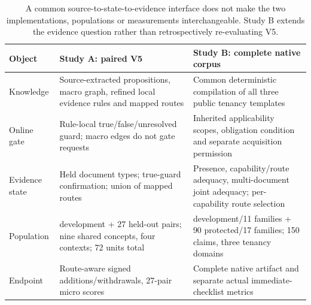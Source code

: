 \begin{table}[t]
\centering\small
\setlength{\tabcolsep}{4pt}
\renewcommand{\arraystretch}{1.09}
\begin{tabularx}{\textwidth}{@{}>{\raggedright\arraybackslash}p{}>{\raggedright\arraybackslash}X>{\raggedright\arraybackslash}X@{}}
\toprule
Object & Study A: paired V5 & Study B: complete native corpus \\
\midrule
Knowledge & Source-extracted propositions, macro graph, refined local evidence rules and mapped routes & Common deterministic compilation of all three public tenancy templates \\
Online gate & Rule-local true/false/unresolved guard; macro edges do not gate requests & Inherited applicability scopes, obligation condition and separate acquisition permission \\
Evidence state & Held document types; true-guard confirmation; union of mapped routes & Presence, capability/route adequacy, multi-document joint adequacy; per-capability route selection \\
Population & 9 development + 27 held-out pairs; nine shared concepts, four contexts; 72 units total & 60 development/11 families + 90 protected/17 families; 150 claims, three tenancy domains \\
Endpoint & Route-aware signed additions/withdrawals, 27-pair micro scores & Complete native artifact and separate actual immediate-checklist metrics \\
\bottomrule
\end{tabularx}
\caption{A common source-to-state-to-evidence interface does not make the two
implementations, populations or measurements interchangeable. Study B extends
the evidence question rather than retrospectively re-evaluating V5.}
\label{tab:correspondence}
\end{table}
